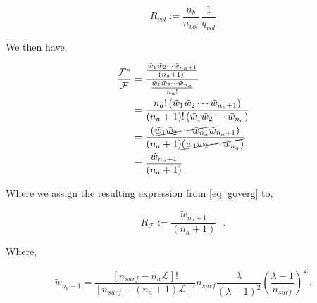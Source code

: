\documentclass[12pt,letterpaper]{article}
\newcommand{\leng}{\mathcal{L}}
\newcommand{\lr}[1]{\left( #1 \right)}
\newcommand{\fop}{\ensuremath{\mathcal{F}}}
\begin{document}
\begin{equation}
    R_{vol}:=
    		\frac{
		    n_b
		}{
		    n_{vol} 
		}
		~
    \frac{
    1
}{
    q_{vol}
}
   \label{Rvol}
\end{equation}

We then have,

\begin{align}
\label{eq. goverg}
\frac{
    \fop^{*}
}{
    \fop
}
&=
\frac{
    \frac{
        \tilde{w}_1
        \tilde{w}_2
        \cdots 
        \tilde{w}_{n_a+1}
    }{
        (n_a+1)!
    }   
}{   
    \frac{
        \tilde{w}_1
        \tilde{w}_2
        \cdots 
        \tilde{w}_{n_a}
    }{
        n_a!
    }   
}\nonumber\\
&=
\frac{
        n_a!
        \lr{
            \tilde{w}_1
            \tilde{w}_2
            \cdots 
            \tilde{w}_{n_a+1}
        }       
}{ 
        (n_a+1)!
        \lr{
            \tilde{w}_1
            \tilde{w}_2
            \cdots 
            \tilde{w}_{n_a}
            }
}\\
&=
\frac{
        \lr{
            \cancel{
                \tilde{w}_1
                \tilde{w}_2
                \cdots 
                \tilde{w}_{n_a}
            }
            \tilde{w}_{n_a+1}
        }       
}{ 
        (n_a+1)
        \cancel{
            \lr{
                \tilde{w}_1
                \tilde{w}_2
                \cdots 
                \tilde{w}_{n_a}
                }
        }
}\nonumber\\
&=
\frac{
            \tilde{w}_{n_a+1}       
}{ 
        (n_a+1)
}\nonumber
\end{align}

Where we assign the resulting expression from \ref{eq. goverg} to,

\begin{equation}
    R_{\fop}:=
    \frac{
                \tilde{w}_{n_a+1}       
    }{ 
            (n_a+1)
    }~~~\textbf{.}
   \label{Eq: RG}
\end{equation}

Where,

\begin{equation}
   \tilde{w}_{n_a+1} 
   =
   \frac{
        [
            n_{surf}
            -
            n_a
            \leng
        ]
        !
   }{
        [
            n_{surf}
            -
        (n_a+1)
        \leng
        ]
        !
   }   
    n_{surf}
   \frac{
        \lambda
   }{
        (\lambda-1)^2
   }
   \left(
        \frac{
            \lambda
            -
            1
        }{
            n_{surf}
        }
    \right)
    ^{
            \leng
    }.
    \label{wk2supp}
\end{equation}
\end{document}
